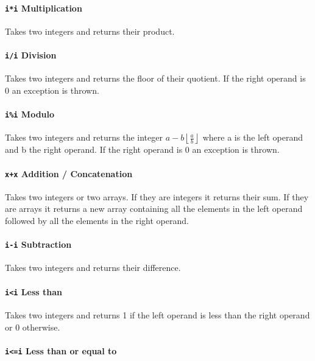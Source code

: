 \documentclass[12pt, a4paper]{article}
\begin{document}
\paragraph{\texttt{i*i} \quad Multiplication}

Takes two integers and returns their product.

\paragraph{\texttt{i/i} \quad Division}

Takes two integers and returns the floor of their quotient. If the right operand is 0 an exception is thrown.

\paragraph{\texttt{i\%i} \quad Modulo}

Takes two integers and returns the integer $ a - b \left\lfloor \frac{a}{b} \right\rfloor $ where a is the left operand and b the right operand. If the right operand is 0 an exception is thrown.

\paragraph{\texttt{x+x} \quad Addition / Concatenation}

Takes two integers or two arrays. If they are integers it returns their sum. If they are arrays it returns a new array containing all the elements in the left operand followed by all the elements in the right operand.

\paragraph{\texttt{i-i} \quad Subtraction}

Takes two integers and returns their difference.

\paragraph{\texttt{i<i} \quad Less than}

Takes two integers and returns 1 if the left operand is less than the right operand or 0 otherwise.

\paragraph{\texttt{i<=i} \quad Less than or equal to}
\end{document}
